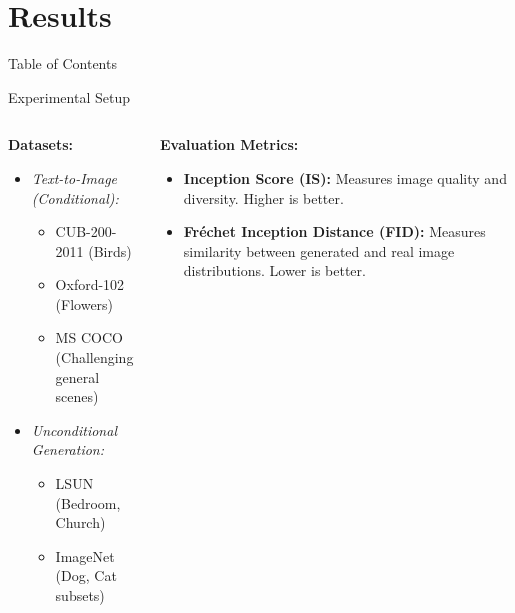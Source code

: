 \documentclass{beamer}
\newcommand{\paperfigure}[3][width=\textwidth]{%
    \begin{figure}%
        \centering%
        \texttt{[image: figures/\#2.png]}%
        \caption{#3 (Source:~\cite{stackgan++})}%
    \end{figure}%
}
\begin{document}

\section{Results}
\begin{frame}{Table of Contents}
    \tableofcontents[currentsection]
\end{frame}

\begin{frame}{Experimental Setup}
    \begin{columns}[T]
        \begin{column}{0.5\textwidth}
            \textbf{Datasets:}
            \begin{itemize}
                \item \textit{Text-to-Image (Conditional):}
                    \begin{itemize}
                        \item CUB-200-2011 (Birds)
                        \item Oxford-102 (Flowers)
                        \item MS COCO (Challenging general scenes)
                    \end{itemize}
                \item \textit{Unconditional Generation:}
                    \begin{itemize}
                        \item LSUN (Bedroom, Church)
                        \item ImageNet (Dog, Cat subsets)
                    \end{itemize}
            \end{itemize}
        \end{column}
        \begin{column}{0.5\textwidth}
            \textbf{Evaluation Metrics:}
            \begin{itemize}
                \item \textbf{Inception Score (IS):} Measures image quality and diversity. Higher is better.
                \item \textbf{Fréchet Inception Distance (FID):} Measures similarity between generated and real image distributions. Lower is better.

\end{itemize}
\end{column}
\end{columns}
\end{frame}
\end{document}
